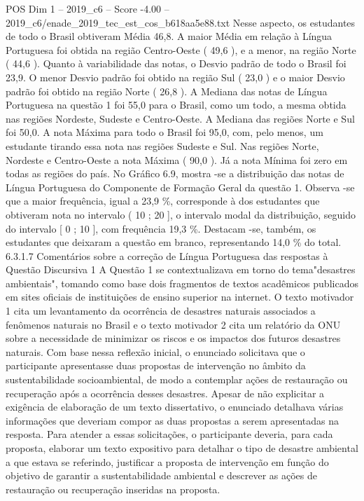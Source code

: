 \begin{textsample}{POS Dim 1 – 2019\_c6 – Score -4.00 – 2019\_c6/enade\_2019\_tec\_est\_cos\_b618aa5e88.txt}
Nesse aspecto, os estudantes de todo o Brasil obtiveram Média 46,8.
A maior Média em relação à Língua Portuguesa foi obtida na região Centro-Oeste ( 49,6 ), e a menor, na região Norte ( 44,6 ).
Quanto à variabilidade das notas, o Desvio padrão de todo o Brasil foi 23,9.
O menor Desvio padrão foi obtido na região Sul ( 23,0 ) e o maior Desvio padrão foi obtido na região Norte ( 26,8 ).
A Mediana das notas de Língua Portuguesa na questão 1 foi 55,0 para o Brasil, como um todo, a mesma obtida nas regiões Nordeste, Sudeste e Centro-Oeste.
A Mediana das regiões Norte e Sul foi 50,0.
A nota Máxima para todo o Brasil foi 95,0, com, pelo menos, um estudante tirando essa nota nas regiões Sudeste e Sul.
Nas regiões Norte, Nordeste e Centro-Oeste a nota Máxima ( 90,0 ).
Já a nota Mínima foi zero em todas as regiões do país.
No Gráfico 6.9, mostra -se a distribuição das notas de Língua Portuguesa do Componente de Formação Geral da questão 1.
Observa -se que a maior frequência, igual a 23,9 \%, corresponde à dos estudantes que obtiveram nota no intervalo ( 10 ; 20 ], o intervalo modal da distribuição, seguido do intervalo [ 0 ; 10 ], com frequência 19,3 \%.
Destacam -se, também, os estudantes que deixaram a questão em branco, representando 14,0 \% do total. 6.3.1.7 Comentários sobre a correção de Língua Portuguesa das respostas à Questão Discursiva 1 A Questão 1 se contextualizava em torno do tema"desastres ambientais", tomando como base dois fragmentos de textos acadêmicos publicados em sites oficiais de instituições de ensino superior na internet.
O texto motivador 1 cita um levantamento da ocorrência de desastres naturais associados a fenômenos naturais no Brasil e o texto motivador 2 cita um relatório da ONU sobre a necessidade de minimizar os riscos e os impactos dos futuros desastres naturais.
Com base nessa reflexão inicial, o enunciado solicitava que o participante apresentasse duas propostas de intervenção no âmbito da sustentabilidade socioambiental, de modo a contemplar ações de restauração ou recuperação após a ocorrência desses desastres.
Apesar de não explicitar a exigência de elaboração de um texto dissertativo, o enunciado detalhava várias informações que deveriam compor as duas propostas a serem apresentadas na resposta.
Para atender a essas solicitações, o participante deveria, para cada proposta, elaborar um texto expositivo para detalhar o tipo de desastre ambiental a que estava se referindo, justificar a proposta de intervenção em função do objetivo de garantir a sustentabilidade ambiental e descrever as ações de restauração ou recuperação inseridas na proposta.

\end{textsample}
